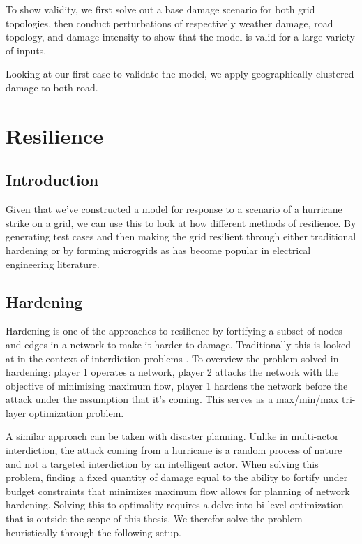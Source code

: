 \documentclass{article}
\begin{document}
	To show validity, we first solve out a base damage scenario for both grid topologies, then conduct perturbations of respectively weather damage, road topology, and damage intensity to show that the model is valid for a large variety of inputs. 
	
	Looking at our first case to validate the model, we apply geographically clustered damage to both road. 
	
	

	\section{Resilience}
	\subsection{Introduction}
	Given that we've constructed a model for response to a scenario of a hurricane strike on a grid, we can use this to look at how different methods of resilience. By generating test cases and then making the grid resilient through either traditional hardening or by forming microgrids as has become popular in electrical engineering literature.
	\subsection{Hardening}
	
	Hardening is one of the approaches to resilience by fortifying a subset of nodes and edges in a network to make it harder to damage. Traditionally this is looked at in the context of interdiction problems \cite{ChurchEA2007}. To overview the problem solved in hardening: player 1 operates a network, player 2 attacks the network with the objective of minimizing maximum flow, player 1 hardens the network before the attack under the assumption that it's coming. This serves as a max/min/max tri-layer optimization problem.
	
	A similar approach can be taken with disaster planning. Unlike in multi-actor interdiction, the attack coming from a hurricane is a random process of nature and not a targeted interdiction by an intelligent actor. When solving this problem, finding a fixed quantity of damage equal to the ability to fortify under budget constraints that minimizes maximum flow allows for planning of network hardening. Solving this to optimality requires a delve into bi-level optimization that is outside the scope of this thesis. We therefor solve the problem heuristically through the following setup.
	
\end{document}
